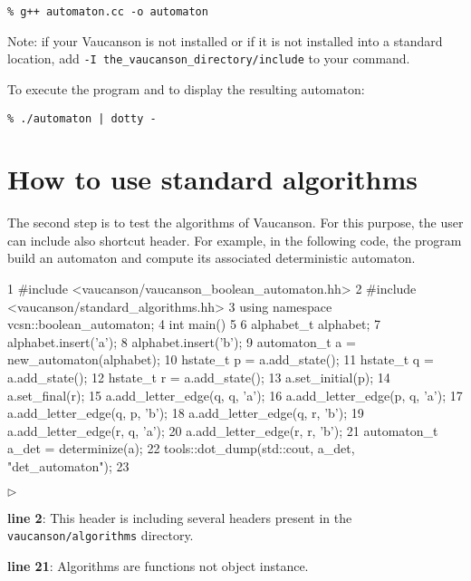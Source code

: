 \documentclass{article}
\begin{document}
\begin{verbatim}
% g++ automaton.cc -o automaton
\end{verbatim}

Note: if your Vaucanson is not installed or if it is not installed
into a standard location, add \verb!-I the_vaucanson_directory/include!
to your command.

To execute the program and to display the resulting automaton:

\begin{verbatim}
% ./automaton | dotty -
\end{verbatim}

\section{How to use standard algorithms}

The second step is to test the algorithms of Vaucanson. For this
purpose, the user can include also shortcut header. For example, in
the following code, the program build an automaton and compute its
associated deterministic automaton.

\begin{code}
1  #include <vaucanson/vaucanson_boolean_automaton.hh>
2  #include <vaucanson/standard_algorithms.hh>
3  using namespace vcsn::boolean_automaton;
4  int main()
5  {
6    alphabet_t alphabet;
7    alphabet.insert('a');
8    alphabet.insert('b');
9    automaton_t a = new_automaton(alphabet);
10   hstate_t p = a.add_state();
11   hstate_t q = a.add_state();
12   hstate_t r = a.add_state();
13   a.set_initial(p);
14   a.set_final(r);
15   a.add_letter_edge(q, q, 'a');
16   a.add_letter_edge(p, q, 'a');
17   a.add_letter_edge(q, p, 'b');
18   a.add_letter_edge(q, r, 'b');
19   a.add_letter_edge(r, q, 'a');
20   a.add_letter_edge(r, r, 'b');
21   automaton_t a_det = determinize(a);
22   tools::dot_dump(std::cout, a_det, "det_automaton");
23 }
\end{code}

\begin{list}{$\triangleright$}{}
\item \textbf{line 2}: This header is including several headers present
in the \verb!vaucanson/algorithms! directory.
\item \textbf{line 21}: Algorithms are functions not object instance.
\end{list}
\end{document}
